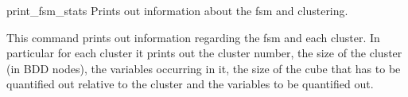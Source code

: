 \begin{nusmvCommand}{print\_fsm\_stats} {Prints out information about the fsm and clustering.}


   This command prints out information regarding the fsm and each cluster.
   In particular for each cluster it prints out the cluster number, the size
   of the cluster (in BDD nodes), the variables occurring in it, the size of
   the cube that has to be quantified out relative to the cluster and the
   variables to be quantified out.

\begin{cmdOpt}

\end{cmdOpt}

\end{nusmvCommand}

